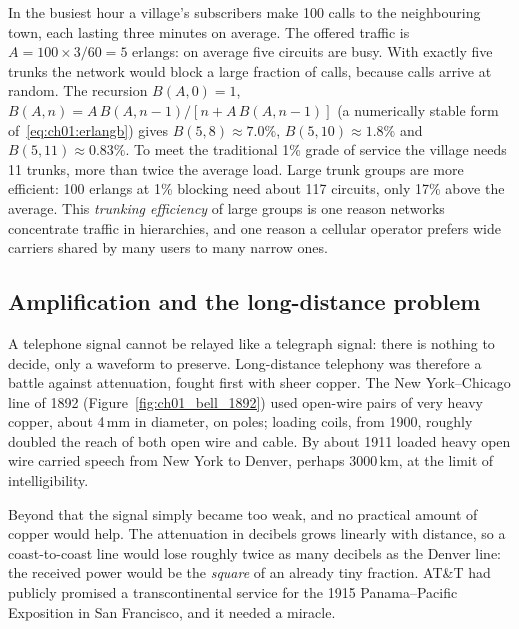 \begin{worked}
In the busiest hour a village's subscribers make 100 calls to the neighbouring town, each lasting
three minutes on average. The offered traffic is $A = 100\times3/60 = 5$ erlangs: on average five
circuits are busy. With exactly five trunks the network would block a large fraction of calls,
because calls arrive at random. The recursion $B(A,0)=1$,
$B(A,n)=A\,B(A,n-1)/[n+A\,B(A,n-1)]$ (a numerically stable form of~\eqref{eq:ch01:erlangb}) gives
$B(5,8)\approx7.0\%$, $B(5,10)\approx1.8\%$ and $B(5,11)\approx0.83\%$. To meet the traditional
1\% grade of service the village needs 11 trunks, more than twice the average load. Large trunk
groups are more efficient: 100 erlangs at 1\% blocking need about 117 circuits, only 17\% above
the average. This \emph{trunking efficiency} of large groups is one reason networks concentrate traffic
in hierarchies, and one reason a cellular operator prefers wide carriers shared by many users to
many narrow ones.
\end{worked}

\subsection{Amplification and the long-distance problem}
\label{sec:ch01:repeaters}

A telephone signal cannot be relayed like a telegraph signal: there is nothing to decide, only a
waveform to preserve. Long-distance telephony was therefore a battle against attenuation, fought
first with sheer copper. The New York--Chicago line of 1892 (Figure~\ref{fig:ch01_bell_1892}) used
open-wire pairs of very heavy copper, about 4\,mm in diameter, on poles; loading coils, from 1900,
roughly doubled the reach of both open wire and cable. By about 1911 loaded heavy open wire carried
speech from New York to Denver, perhaps 3000\,km, at the limit of intelligibility.


Beyond that the signal simply became too weak, and no practical amount of copper would help. The
attenuation in decibels grows linearly with distance, so a coast-to-coast line would lose roughly
twice as many decibels as the Denver line: the received power would be the \emph{square} of an
already tiny fraction. AT\&T had publicly promised a transcontinental service for the 1915
Panama--Pacific Exposition in San Francisco, and it needed a miracle.


